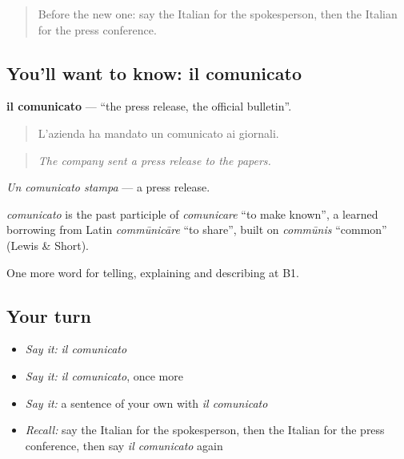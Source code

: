 \label{lesson:IT-C285-comunicato}



\begin{quote}
Before the new one: say the Italian for the spokesperson, then the Italian for the press conference.
\end{quote}

\subsection*{You'll want to know: il comunicato}
\textbf{il comunicato} — \textquotedblleft{}the press release, the official bulletin\textquotedblright{}.

\begin{quote}
L'azienda ha mandato un comunicato ai giornali.
\end{quote}

\begin{quote}
\emph{The company sent a press release to the papers.}
\end{quote}

\emph{Un comunicato stampa} — a press release.

\begin{cousinweb}
\emph{comunicato} is the past participle of \emph{comunicare} \textquotedblleft{}to make known\textquotedblright{}, a learned borrowing from Latin \emph{commūnicāre} \textquotedblleft{}to share\textquotedblright{}, built on \emph{commūnis} \textquotedblleft{}common\textquotedblright{} (Lewis \& Short).
\end{cousinweb}

\begin{grammarlens}[title={What you've built}]
One more word for telling, explaining and describing at B1.
\end{grammarlens}

\subsection*{Your turn}
\begin{itemize}
\raggedright
  \item \emph{Say it:} \emph{il comunicato}
  \item \emph{Say it:} \emph{il comunicato}, once more
  \item \emph{Say it:} a sentence of your own with \emph{il comunicato}
  \item \emph{Recall:} say the Italian for the spokesperson, then the Italian for the press conference, then say \emph{il comunicato} again
\end{itemize}

